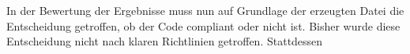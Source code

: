 \documentclass[../main.tex]{subfiles}
\begin{document}
In der Bewertung der Ergebnisse muss nun auf Grundlage der erzeugten Datei die Entscheidung getroffen, ob der Code compliant oder nicht ist.
Bisher wurde diese Entscheidung nicht nach klaren Richtlinien getroffen.
Stattdessen 
\end{document}
